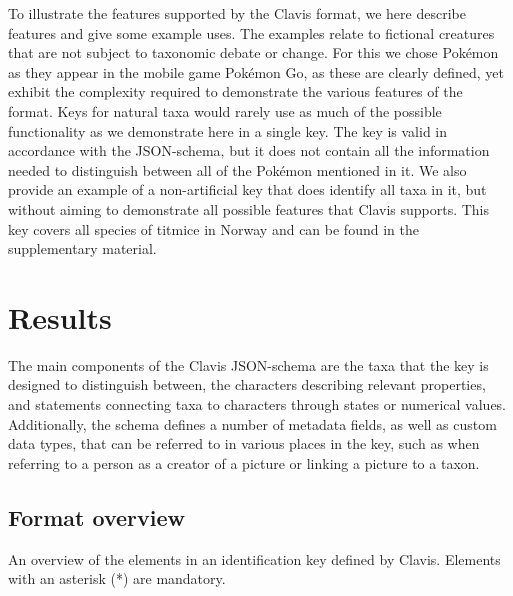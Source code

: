 \documentclass[10pt,letterpaper]{article}
\begin{document}
To illustrate the features supported by the Clavis format, we here describe features and give some example uses. The examples relate to fictional creatures that are not subject to taxonomic debate or change. For this we chose Pokémon as they appear in the mobile game Pokémon Go, as these are clearly defined, yet exhibit the complexity required to demonstrate the various features of the format. Keys for natural taxa would rarely use as much of the possible functionality as we demonstrate here in a single key. The key is valid in accordance with the JSON-schema, but it does not contain all the information needed to distinguish between all of the Pokémon mentioned in it. We also provide an example of a non-artificial key that does identify all taxa in it, but without aiming to demonstrate all possible features that Clavis supports. This key covers all species of titmice in Norway and can be found in the supplementary material.

\section*{
Results
}
The main components of the Clavis JSON-schema are the taxa that the key is designed to distinguish between, the characters describing relevant properties, and statements connecting taxa to characters through states or numerical values. Additionally, the schema defines a number of metadata fields, as well as custom data types, that can be referred to in various places in the key, such as when referring to a person as a creator of a picture or linking a picture to a taxon.

\subsection*{
Format overview
}
An overview of the elements in an identification key defined by Clavis. Elements with an asterisk (*) are mandatory.
\end{document}
